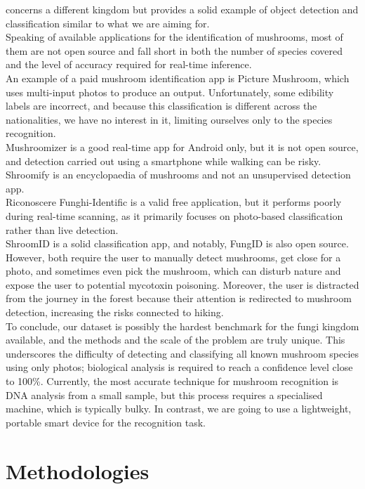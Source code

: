\documentclass[conference]{IEEEtran}
\begin{document}
\cite{shafik2024transfer} concerns a different kingdom but provides a solid example of object detection and classification similar to what we are aiming for.\\
Speaking of available applications for the identification of mushrooms, most of them are not open source and fall short in both the number of species covered and the level of accuracy required for real-time inference.\\
An example of a paid mushroom identification app is Picture Mushroom, which uses multi-input photos to produce an output. Unfortunately, some edibility labels are incorrect, and because this classification is different across the nationalities, we have no interest in it, limiting ourselves only to the species recognition\cite{book}.\\
Mushroomizer is a good real-time app for Android only, but it is not open source, and detection carried out using a smartphone while walking can be risky.\\
Shroomify is an encyclopaedia of mushrooms and not an unsupervised detection app.\\
Riconoscere Funghi-Identific is a valid free application, but it performs poorly during real-time scanning, as it primarily focuses on photo-based classification rather than live detection.\\
ShroomID is a solid classification app, and notably, FungID is also open source. However, both require the user to manually detect mushrooms, get close for a photo, and sometimes even pick the mushroom, which can disturb nature and expose the user to potential mycotoxin poisoning. Moreover, the user is distracted from the journey in the forest because their attention is redirected to mushroom detection, increasing the risks connected to hiking.\\
To conclude, our dataset is possibly the hardest benchmark for the fungi kingdom available, and the methods and the scale of the problem are truly unique. This underscores the difficulty of detecting and classifying all known mushroom species using only photos; biological analysis is required to reach a confidence level close to 100\%. Currently, the most accurate technique for mushroom recognition is DNA analysis from a small sample, but this process requires a specialised machine, which is typically bulky. In contrast, we are going to use a lightweight, portable smart device for the recognition task.

\section{Methodologies}
\end{document}
